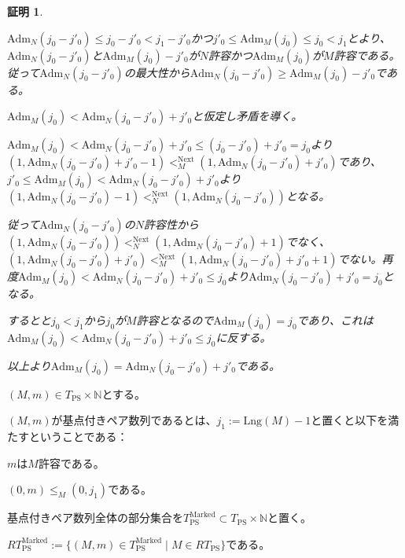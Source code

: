 \documentclass[dvipdfmx,uplatex]{jsarticle}
\theoremstyle{customnonumberbreakfortheorem}
\theoremstyle{customnonumberbreakforproof}
\newtheorem{hideableproof}{証明}
\begin{document}
\begin{hideableproof}
	\begin{indented}
		\item \(\textrm{Adm}_N(j_0-j'_0) \leq j_0-j'_0 < j_1-j'_0\)かつ\(j'_0 \leq \textrm{Adm}_M(j_0) \leq j_0 < j_1\)とより、\(\textrm{Adm}_N(j_0-j'_0)\)と\(\textrm{Adm}_M(j_0)-j'_0\)が\(N\)許容かつ\(\textrm{Adm}_M(j_0)\)が\(M\)許容である。従って\(\textrm{Adm}_N(j_0-j'_0)\)の最大性から\(\textrm{Adm}_N(j_0-j'_0) \geq \textrm{Adm}_M(j_0)-j'_0\)である。
		\item \(\textrm{Adm}_M(j_0) < \textrm{Adm}_N(j_0-j'_0)+j'_0\)と仮定し矛盾を導く。
		\begin{indented}
			\item \(\textrm{Adm}_M(j_0) < \textrm{Adm}_N(j_0-j'_0)+j'_0 \leq (j_0-j'_0)+j'_0 = j_0\)より\((1,\textrm{Adm}_N(j_0-j'_0)+j'_0-1) <_M^{\textrm{Next}} (1,\textrm{Adm}_N(j_0-j'_0)+j'_0)\)であり、\(j'_0 \leq \textrm{Adm}_M(j_0) < \textrm{Adm}_N(j_0-j'_0)+j'_0\)より\((1,\textrm{Adm}_N(j_0-j'_0)-1) <_N^{\textrm{Next}} (1,\textrm{Adm}_N(j_0-j'_0))\)となる。
			\item 従って\(\textrm{Adm}_N(j_0-j'_0)\)の\(N\)許容性から\((1,\textrm{Adm}_N(j_0-j'_0)) <_N^{\textrm{Next}} (1,\textrm{Adm}_N(j_0-j'_0)+1)\)でなく、\((1,\textrm{Adm}_N(j_0-j'_0)+j'_0) <_M^{\textrm{Next}} (1,\textrm{Adm}_N(j_0-j'_0)+j'_0+1)\)でない。再度\(\textrm{Adm}_M(j_0) < \textrm{Adm}_N(j_0-j'_0)+j'_0 \leq j_0\)より\(\textrm{Adm}_N(j_0-j'_0)+j'_0 = j_0\)となる。
			\item するとと\(j_0 < j_1\)から\(j_0\)が\(M\)許容となるので\(\textrm{Adm}_M(j_0) = j_0\)であり、これは\(\textrm{Adm}_M(j_0) < \textrm{Adm}_N(j_0-j'_0)+j'_0 \leq j_0\)に反する。
		\end{indented}
		\item 以上より\(\textrm{Adm}_M(j_0) = \textrm{Adm}_N(j_0-j'_0)+j'_0\)である。
	\end{indented}
\end{hideableproof}

\((M,m) \in T_{\textrm{PS}} \times \mathbb{N}\)とする。
\begin{nenumerate}
	\item \((M,m)\)が基点付きペア数列であるとは、\(j_1 := \textrm{Lng}(M)-1\)と置くと以下を満たすということである：
	\begin{nenumerate}
		\item \(m\)は\(M\)許容である。
		\item \((0,m) \leq_M (0,j_1)\)である。
	\end{nenumerate}
	\item 基点付きペア数列全体の部分集合を\(T_{\textrm{PS}}^{\textrm{Marked}} \subset T_{\textrm{PS}} \times \mathbb{N}\)と置く。
	\item \(RT_{\textrm{PS}}^{\textrm{Marked}} := \{(M,m) \in T_{\textrm{PS}}^{\textrm{Marked}} \mid M \in RT_{\textrm{PS}}\}\)である。
\end{nenumerate}
\end{document}
